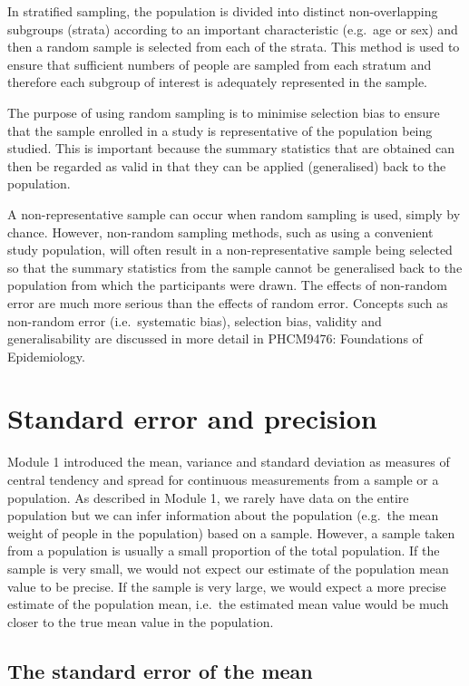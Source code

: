 \documentclass[
]{memoir}
\begin{document}
In stratified sampling, the population is divided into distinct non-overlapping subgroups (strata) according to an important characteristic (e.g.~age or sex) and then a random sample is selected from each of the strata. This method is used to ensure that sufficient numbers of people are sampled from each stratum and therefore each subgroup of interest is adequately represented in the sample.

The purpose of using random sampling is to minimise selection bias to ensure that the sample enrolled in a study is representative of the population being studied. This is important because the summary statistics that are obtained can then be regarded as valid in that they can be applied (generalised) back to the population.

A non-representative sample can occur when random sampling is used, simply by chance. However, non-random sampling methods, such as using a convenient study population, will often result in a non-representative sample being selected so that the summary statistics from the sample cannot be generalised back to the population from which the participants were drawn. The effects of non-random error are much more serious than the effects of random error. Concepts such as non-random error (i.e.~systematic bias), selection bias, validity and generalisability are discussed in more detail in PHCM9476: Foundations of Epidemiology.

\hypertarget{standard-error-and-precision}{%
\section{Standard error and precision}\label{standard-error-and-precision}}

Module 1 introduced the mean, variance and standard deviation as measures of central tendency and spread for continuous measurements from a sample or a population. As described in Module 1, we rarely have data on the entire population but we can infer information about the population (e.g.~the mean weight of people in the population) based on a sample. However, a sample taken from a population is usually a small proportion of the total population. If the sample is very small, we would not expect our estimate of the population mean value to be precise. If the sample is very large, we would expect a more precise estimate of the population mean, i.e.~the estimated mean value would be much closer to the true mean value in the population.

\hypertarget{the-standard-error-of-the-mean}{%
\subsection{The standard error of the mean}\label{the-standard-error-of-the-mean}}
\end{document}
